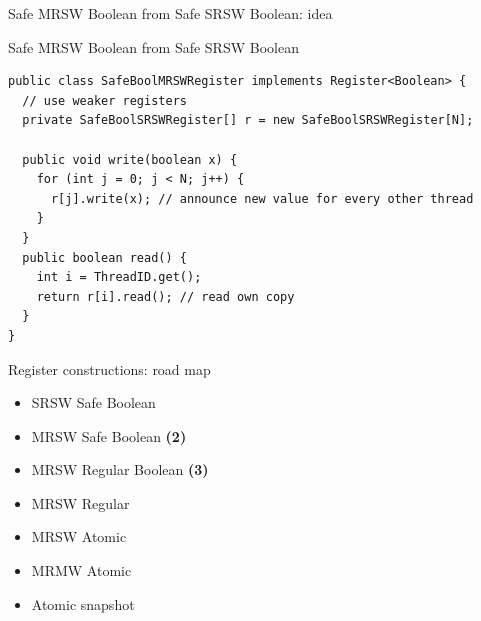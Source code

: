 \begin{frame}[t,fragile]{Safe MRSW Boolean from Safe SRSW Boolean: idea}

\end{frame}

\begin{frame}[t,fragile]{Safe MRSW Boolean from Safe SRSW Boolean}

\begin{verbatim}
public class SafeBoolMRSWRegister implements Register<Boolean> {
  // use weaker registers
  private SafeBoolSRSWRegister[] r = new SafeBoolSRSWRegister[N];

  public void write(boolean x) {
    for (int j = 0; j < N; j++) {
      r[j].write(x); // announce new value for every other thread
    }
  }
  public boolean read() {
    int i = ThreadID.get();
    return r[i].read(); // read own copy
  }
}
\end{verbatim}
\end{frame}


\begin{frame}{Register constructions: road map}

\begin{itemize}
  \item SRSW Safe Boolean 
  \item MRSW Safe Boolean \textbf{(2)}
  \item MRSW Regular Boolean \textbf{(3)}
  \item MRSW Regular
  \item MRSW Atomic
  \item MRMW Atomic
  \item Atomic snapshot
\end{itemize}

\end{frame}

